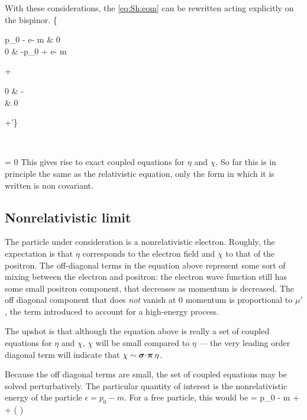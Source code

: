 With these considerations, the \eqref{eq:Sh:eom} can be rewritten acting explicitly on the bispinor.
\beq \label{eq:Sh:matrixEOM}
	\left\{
		\begin{pmatrix}
			p_0 - e\Phi	- m &	0	\\
			0	&	-p_0 + e\Phi - m	\\
		\end{pmatrix}
		+
		\begin{pmatrix}	0 & -\sigdotg{\pi} \\  \sigdotg{\pi} & 0 \end{pmatrix} 
		+\mu' 
	\right\} \begin{pmatrix} \eta \\ \chi \end{pmatrix}
		= 0
\eeq
This gives rise to exact coupled equations for $\eta$ and $\chi$.  So far this is in principle the same as the relativistic equation, only the form in which it is written is non covariant.

\subsection{Nonrelativistic limit}

The particle under consideration is a nonrelativistic electron.  Roughly, the expectation is that $\eta$ corresponds to the electron field and $\chi$ to that of the positron.  The off-diagonal terms in the equation above represent some sort of mixing between the electron and positron: the electron wave function still has some small positron component, that decreases as momentum is decreased.    The off diagonal component that does {\it not} vanish at 0 momentum is proportional to $\mu'$, the term introduced to account for a high-energy process.

The upshot is that although the equation above is really a set of coupled equations for $\eta$ and $\chi$, $\chi$ will be small compared to $\eta$ --- the very leading order diagonal term will indicate that $\chi \sim \mbox{\boldmath$ \sigma $} \hspace{-2pt} \cdot \hspace{-2pt} \mbox{\boldmath$ \pi $} \, \eta$.

Because the off diagonal terms are small, the set of coupled equations may be solved perturbatively.  The particular quantity of interest is the nonrelativistic energy of the particle $\epsilon = p_0 - m$.  For a free particle, this would be
\beq
	\epsilon = p_0 - m \approx {} +  + \left ( \right )
\eeq  

